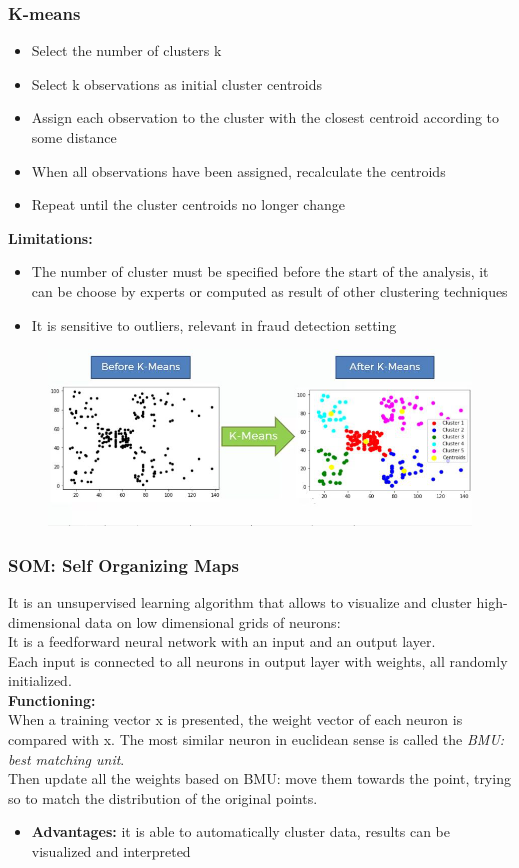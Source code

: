     \subsubsection{K-means}
        \begin{itemize}
            \item Select the number of clusters k
            \item Select k observations as initial cluster centroids
            \item Assign each observation to the cluster with the closest centroid according to some distance 
            \item When all observations have been assigned, recalculate the centroids
            \item Repeat until the cluster centroids no longer change
        \end{itemize}
        \textbf{Limitations:}
        \begin{itemize}
            \item The number of cluster must be specified before the start of the analysis, it can be choose by experts or computed as result of other clustering techniques
            \item It is sensitive to outliers, relevant in fraud detection setting
        \end{itemize}
        \begin{figure}[ht!]
            \centering
            \includegraphics[width=0.6\linewidth]{lecture_13/kmeans.png}
        \end{figure}
    \subsubsection{SOM: Self Organizing Maps}
        It is an unsupervised learning algorithm that allows to visualize and cluster high-dimensional data on low dimensional grids of neurons:\\
        It is a feedforward neural network with an input and an output layer.\\
        Each input is connected to all neurons in output layer with weights, all randomly initialized.\\
        \textbf{Functioning:}\\
        When a training vector x is presented, the weight vector of each neuron is compared with x. The most similar neuron in euclidean sense is called the \textit{BMU: best matching unit}.\\
        Then update all the weights based on BMU: move them towards the point, trying so to match the distribution of the original points.
        \begin{itemize}
            \item \textbf{Advantages:} it is able to automatically cluster data, results can be visualized and interpreted
        \end{itemize}